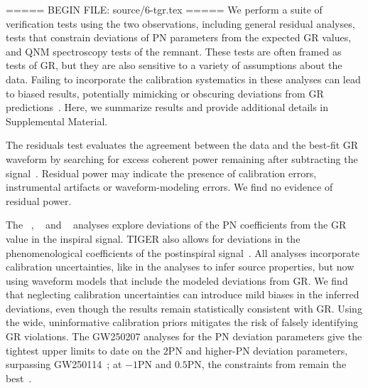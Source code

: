 ===== BEGIN FILE: source/6-tgr.tex =====
We perform a suite of verification tests using the two observations, including general residual analyses, tests that constrain deviations of \ac{PN} parameters from the expected \ac{GR} values, and \ac{QNM} spectroscopy tests of the remnant.
These tests are often framed as tests of \ac{GR}, but they are also sensitive to a variety of assumptions about the data.
Failing to incorporate the calibration systematics in these analyses can lead to biased results, potentially mimicking or obscuring deviations from \ac{GR} predictions~\cite{Hall:2017off,Gupta:2024gun}.
Here, we summarize results and provide additional details in Supplemental Material\citesupp.

The residuals test evaluates the agreement between the data and the best-fit \ac{GR} waveform by searching for excess coherent power remaining after subtracting the signal~\cite{LIGOScientific:2021sio,Johnson-McDaniel:2021yge,LIGOScientific:2026qni}.
Residual power may indicate the presence of calibration errors, instrumental artifacts or waveform-modeling errors.
We find no evidence of residual power.

The ~\cite{Mehta:2022pcn}, ~\cite{Li:2011cg, Agathos:2013upa, Meidam:2017dgf, Roy:2025gzv} and ~\cite{Saleem:2021nsb,Mahapatra:2025cwk} analyses explore deviations of the \ac{PN} coefficients from the \ac{GR} value in the inspiral signal.
\Ac{TIGER} also allows for deviations in the phenomenological coefficients of the postinspiral signal~\cite{Roy:2025gzv}.
All analyses incorporate calibration uncertainties, like in the analyses to infer source properties, but now using waveform models that include the modeled deviations from \ac{GR}.
We find that neglecting calibration uncertainties can introduce mild biases in the inferred deviations, even though the results remain statistically consistent with \ac{GR}.
Using the wide, uninformative calibration priors mitigates the risk of falsely identifying \ac{GR} violations.
The \ac{GW250207} analyses for the \ac{PN} deviation parameters give the tightest upper limits to date on the $2$\ac{PN} and higher-\ac{PN} deviation parameters, surpassing \ac{GW250114}~\cite{LIGOScientific:2025obp}; at $-1$\ac{PN} and $0.5$\ac{PN}, the constraints from  remain the best~\cite{LIGOScientific:2018dkp,LIGOScientific:2026fcf}.

